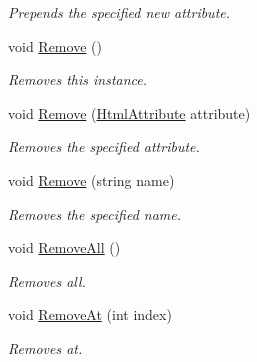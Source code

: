 \begin{DoxyCompactItemize}
\begin{DoxyCompactList}\small\item\em Prepends the specified new attribute. \end{DoxyCompactList}\item 
void \hyperlink{class_html_agility_pack_1_1_html_attribute_collection_a7fa898935a74ae311c6c946f713a1985}{Remove} ()
\begin{DoxyCompactList}\small\item\em Removes this instance. \end{DoxyCompactList}\item 
void \hyperlink{class_html_agility_pack_1_1_html_attribute_collection_a7a470d1728030dcec2613cff64b62a98}{Remove} (\hyperlink{class_html_agility_pack_1_1_html_attribute}{Html\+Attribute} attribute)
\begin{DoxyCompactList}\small\item\em Removes the specified attribute. \end{DoxyCompactList}\item 
void \hyperlink{class_html_agility_pack_1_1_html_attribute_collection_afe1538bf5c2d46b3d9b9cabad36145e1}{Remove} (string name)
\begin{DoxyCompactList}\small\item\em Removes the specified name. \end{DoxyCompactList}\item 
void \hyperlink{class_html_agility_pack_1_1_html_attribute_collection_ad173c2cc928d9237b7933fc6f25245a8}{Remove\+All} ()
\begin{DoxyCompactList}\small\item\em Removes all. \end{DoxyCompactList}\item 
void \hyperlink{class_html_agility_pack_1_1_html_attribute_collection_a4f4f416973c85bd93c829773edc07e3e}{Remove\+At} (int index)
\begin{DoxyCompactList}\small\item\em Removes at. \end{DoxyCompactList}\end{DoxyCompactItemize}
